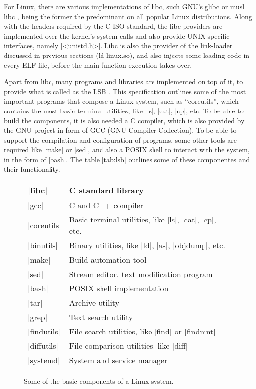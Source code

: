 For Linux, there are various implementations of libc, such
GNU's glibc or musl libc \cite{MuslLibc}, being the former
the predominant on all popular Linux distributions. Along
with the headers required by the C ISO standard, the libc
providers are implemented over the kernel's system calls and
also provide UNIX-specific interfaces, namely |<unistd.h>|.
Libc is also the provider of the link-loader discussed in
previous sections (ld-linux.so), and also injects some
loading code in every ELF file, before the main function
execution takes over.

Apart from libc, many programs and libraries are implemented
on top of it, to provide what is called as the \acl{LSB}
\cite{LinuxStandardBase} . This specification outlines some
of the most important programs that compose a Linux system,
such as ``coreutils'', which contains the most basic
terminal utilities, like |ls|, |cat|, |cp|, etc. To be able
to build the components, it is also needed a C compiler,
which is also provided by the GNU project in form of GCC
(GNU Compiler Collection). To
be able to support the compilation and configuration of
programs, some other tools are required like |make| or
|sed|, and also a POSIX shell to interact with the system,
in the form of |bash|. The table \ref{tab:lsb} outlines some
of these componentes and their functionality.

\begin{figure}[hbt]
    \centerfloat
    \begin{tabular}{ll}
        \hline
        |libc| & C standard library \\
        \hline
        |gcc| & C and C++ compiler \\
        \hline
        |coreutils| & Basic terminal utilities, like |ls|,
        |cat|, |cp|, etc. \\
        \hline
        |binutils| & Binary utilities, like |ld|, |as|,
        |objdump|, etc. \\
        \hline |make| & Build automation tool \\
        \hline |sed| & Stream editor, text modification
        program \\
        \hline |bash| & POSIX shell implementation \\
        \hline |tar| & Archive utility \\
        \hline |grep| & Text search utility \\
        \hline |findutils| & File search utilities, like
        |find| or |findmnt| \\
        \hline |diffutils| & File comparison utilities, like
        |diff| \\
        \hline |systemd| & System and service manager \\
        \hline
    \end{tabular}
    \caption{Some of the basic components of a Linux system.}
\end{figure}

